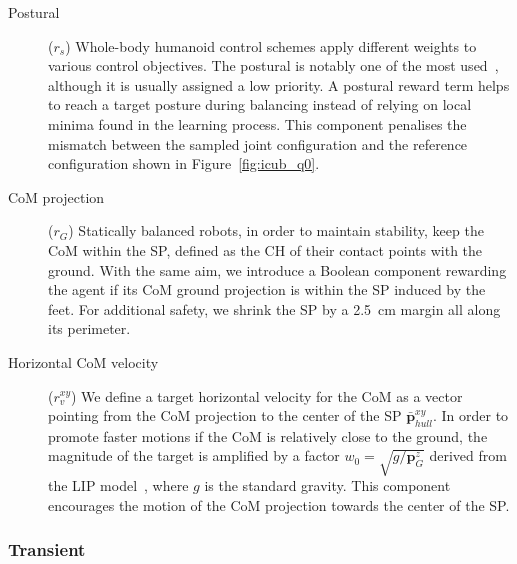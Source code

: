 \begin{description}

\item[Postural]\!($r_s$)\;
%
Whole-body humanoid control schemes apply different weights to various control objectives.
The postural is notably one of the most used~\parencite{nava_stability_2016}, although it is usually assigned a low priority.
A postural reward term helps to reach a target posture during balancing instead of relying on local minima found in the learning process.
This component penalises the mismatch between the sampled joint configuration and the reference configuration shown in Figure~\ref{fig:icub_q0}.

\item[CoM projection]\!($r_{G}$)\;
%
Statically balanced robots, in order to maintain stability, keep the \ac{CoM} within the \ac{SP}, defined as the \ac{CH} of their contact points with the ground.
With the same aim, we introduce a Boolean component rewarding the agent if its \ac{CoM} ground projection is within the \ac{SP} induced by the feet.
For additional safety, we shrink the \ac{SP} by a 2.5~cm margin all along its perimeter.

\item[Horizontal CoM velocity]\!($r_{v}^{xy}$)\;
%
We define a target horizontal velocity for the \ac{CoM} as a vector pointing from the \ac{CoM} projection to the center of the \ac{SP} $\bar{\boldsymbol{p}}^{xy}_{hull}$.
In order to promote faster motions if the \ac{CoM} is relatively close to the ground, the magnitude of the target is amplified by a factor $w_0 = \sqrt{g / \boldsymbol{p}^z_{G}}$ derived from the \ac{LIP} model~\parencite{kajita_3d_2001}, where $g$ is the standard gravity.
This component encourages the motion of the \ac{CoM} projection towards the center of the \ac{SP}.

\end{description}

\subsubsection{Transient}

